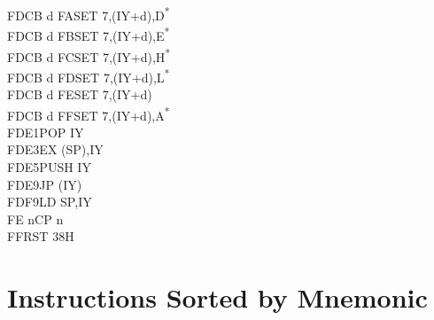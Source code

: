 \documentclass[oneside,a4paper]{book}
\begin{document}
\begin{multicols}{3}
{\begin{tabbing}
FDCB d FA\>SET 7,(IY+d),D\textsuperscript{*}\\
FDCB d FB\>SET 7,(IY+d),E\textsuperscript{*}\\
FDCB d FC\>SET 7,(IY+d),H\textsuperscript{*}\\
FDCB d FD\>SET 7,(IY+d),L\textsuperscript{*}\\
FDCB d FE\>SET 7,(IY+d)\\
FDCB d FF\>SET 7,(IY+d),A\textsuperscript{*}\\
FDE1\>POP IY\\
FDE3\>EX (SP),IY\\
FDE5\>PUSH IY\\
FDE9\>JP (IY)\\
FDF9\>LD SP,IY\\
FE n\>CP n\\
FF\>RST 38H
\end{tabbing}
}
\end{multicols}
\normalsize




\chapter{Instructions Sorted by Mnemonic}
\end{document}
